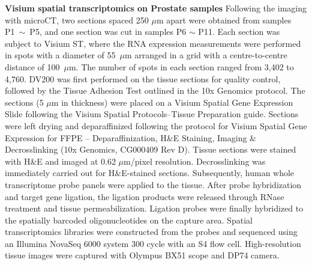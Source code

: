\noindent\textbf{Visium spatial transcriptomics on Prostate samples}
Following the imaging with microCT, two sections spaced 250 $\mu$m apart were obtained from samples P1~$\sim$~P5, and one section was cut in samples P6 $\sim$ P11. Each section was subject to Visium ST, where the RNA expression measurements were performed in spots with a diameter of 55~$\mu$m arranged in a grid with a centre-to-centre distance of 100~$\mu$m. The number of spots in each section ranged from 3,402 to 4,760. DV200 was first performed on the tissue sections for quality control, followed by the Tissue Adhesion Test outlined in the 10x Genomics protocol. The sections (5 $\mu$m in thickness) were placed on a Visium Spatial Gene Expression Slide following the Visium Spatial Protocols–Tissue Preparation guide. Sections were left drying  and deparaffinized following the  protocol for Visium Spatial Gene Expression for FFPE – Deparaffinization, H\&E Staining, Imaging \& Decrosslinking
(10x Genomics, CG000409 Rev D). Tissue sections were stained with H\&E and imaged at 0.62 $\mu$m/pixel resolution. Decrosslinking was immediately carried out for H\&E-stained sections. Subsequently, human whole transcriptome probe panels were applied to the tissue. After probe hybridization and target gene ligation, the ligation products were released through RNase treatment and tissue permeabilization. Ligation probes were finally hybridized to the spatially barcoded oligonucleotides on the capture area.  Spatial transcriptomics libraries were constructed from the probes and sequenced using an Illumina NovaSeq 6000 system 300 cycle with an S4 flow cell. High-resolution tissue images were captured with Olympus BX51 scope and DP74 camera.




